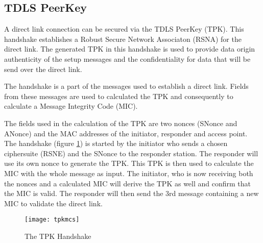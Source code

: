 \subsection{TDLS PeerKey}
\label{sec:tdls-peerkey}

A direct link connection can be secured via the TDLS PeerKey (TPK). This handshake establishes a Robust Secure Network Associaton (RSNA) for the direct link. The generated TPK in this handshake is used to provide data origin authenticity of the setup messages and the confidentiality for data that will be send over the direct link.

The handshake is a part of the messages used to establish a direct link. Fields from these messages are used to calculated the TPK and consequently to calculate a Message Integrity Code (MIC).

The fields used in the calculation of the TPK are two nonces (SNonce and ANonce) and the MAC addresses of the initiator, responder and access point. The handshake (figure \ref{fig:tpk-mcs}) is started by the initiator who sends a chosen ciphersuite (RSNE) and the SNonce to the responder station. The responder will use its own nonce to generate the TPK. This TPK is then used to calculate the MIC with the whole message as input. The initiator, who is now receiving both the nonces and a calculated MIC will derive the TPK as well and confirm that the MIC is valid. The responder will then send the 3rd message containing a new MIC to validate the direct link.

\begin{figure}[!h]
	\centering
	\texttt{[image: tpkmcs]}
	\caption{The TPK Handshake}
	\label{fig:tpk-mcs}
\end{figure}